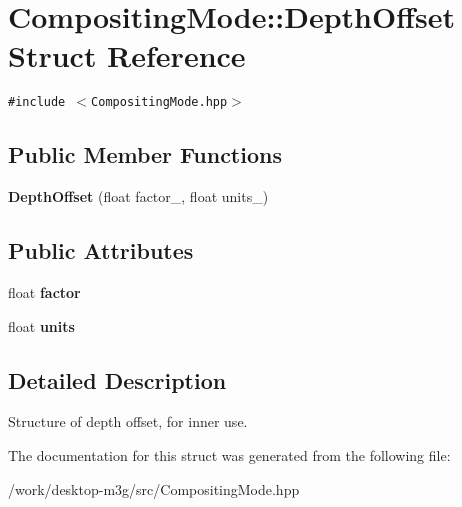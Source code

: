 \hypertarget{structm3g_1_1CompositingMode_1_1DepthOffset}{
\section{CompositingMode::DepthOffset Struct Reference}
\label{structm3g_1_1CompositingMode_1_1DepthOffset}
}
{\tt \#include $<$CompositingMode.hpp$>$}

\subsection*{Public Member Functions}
\begin{CompactItemize}
\item 
\hypertarget{structm3g_1_1CompositingMode_1_1DepthOffset_5bca742cc2bf312b60933a538d3d4107}{
\textbf{DepthOffset} (float factor\_\-, float units\_\-)}
\label{structm3g_1_1CompositingMode_1_1DepthOffset_5bca742cc2bf312b60933a538d3d4107}

\end{CompactItemize}
\subsection*{Public Attributes}
\begin{CompactItemize}
\item 
\hypertarget{structm3g_1_1CompositingMode_1_1DepthOffset_323c112c11500270be91b7cb353826bd}{
float \textbf{factor}}
\label{structm3g_1_1CompositingMode_1_1DepthOffset_323c112c11500270be91b7cb353826bd}

\item 
\hypertarget{structm3g_1_1CompositingMode_1_1DepthOffset_1c0298a96a707800b8223cbf532ab42c}{
float \textbf{units}}
\label{structm3g_1_1CompositingMode_1_1DepthOffset_1c0298a96a707800b8223cbf532ab42c}

\end{CompactItemize}


\subsection{Detailed Description}
Structure of depth offset, for inner use. 

The documentation for this struct was generated from the following file:\begin{CompactItemize}
\item 
/work/desktop-m3g/src/CompositingMode.hpp\end{CompactItemize}
